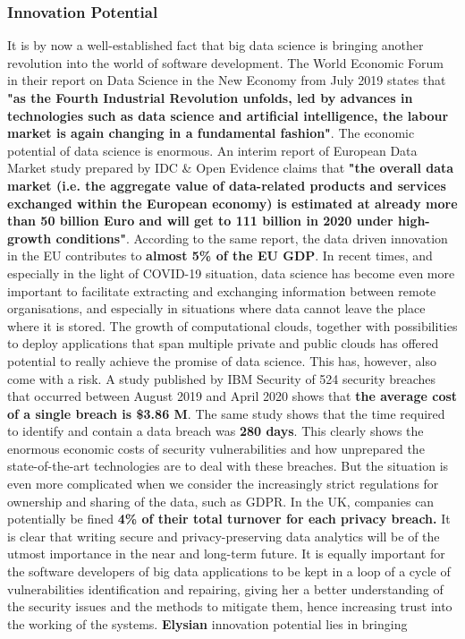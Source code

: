 \documentclass[a4paper,11pt]{article}
\newcommand{\project}[1]{\textbf{#1}\xspace}
\newcommand{\SECURITY}{\project{Elysian}}
\newcommand{\TheProject}{\SECURITY}
\begin{document}
\pagebreak

\subsubsection{Innovation Potential}
\label{sec:innovationpotential}
\label{innovationpotential}


It is by now a well-established fact that big data science is bringing another revolution into the world of software development. The World Economic Forum in their report on Data Science in the New Economy from July 2019 states that \textbf{"as the Fourth Industrial Revolution unfolds, led by advances in technologies such as data science and artificial intelligence, the labour market is again changing in a fundamental fashion"}. The economic potential of data science is enormous. An interim report of European Data Market study prepared by IDC \& Open Evidence claims that \textbf{"the overall data market (i.e. the aggregate value of data-related products and services exchanged within the European economy) is estimated at already more than 50 billion Euro and will get to 111 billion in 2020 under high-growth conditions"}. According to the same report, the data driven innovation in the EU contributes to \textbf{almost 5\% of the EU GDP}. In recent times, and especially in the light of COVID-19 situation, data science has become even more important to facilitate extracting and exchanging information between remote organisations, and especially in situations where data cannot leave the place where it is stored. The growth of computational clouds, together with possibilities to deploy applications that span multiple private and public clouds has offered potential to really achieve the promise of data science. This has, however, also come with a risk. A study published by IBM Security of 524 security breaches that occurred between August 2019 and April 2020 shows that \textbf{the average cost of a single breach is \$3.86 M}. The same study shows that the time required to identify and contain a data breach was \textbf{280 days}. This clearly shows the enormous economic costs of security vulnerabilities and how unprepared the state-of-the-art technologies are to deal with these breaches. But the situation is even more complicated when we consider the increasingly strict regulations for ownership and sharing of the data, such as GDPR. In the UK, companies can potentially be fined \textbf{4\% of their total turnover for each privacy breach.} It is clear that writing secure and privacy-preserving data analytics will be of the utmost importance in the near and long-term future. It is equally important for the software developers of big data applications to be kept in a loop of a cycle of vulnerabilities identification and repairing, giving her a better understanding of the security issues and the methods to mitigate them, hence increasing trust into the working of the systems. \TheProject{} innovation potential lies in bringing 
\end{document}
